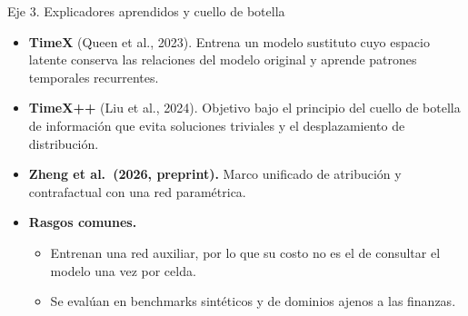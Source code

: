 \documentclass{beamer}
\begin{document}
\begin{frame}{Eje 3. Explicadores aprendidos y cuello de botella}
    \small
    \begin{itemize}
        \item \textbf{TimeX} (Queen et al., 2023). Entrena un modelo
        sustituto cuyo espacio latente conserva las relaciones del modelo
        original y aprende patrones temporales recurrentes.
        \vspace{0.1cm}
        \item \textbf{TimeX++} (Liu et al., 2024). Objetivo bajo el
        principio del cuello de botella de información que evita
        soluciones triviales y el desplazamiento de distribución.
        \vspace{0.1cm}
        \item \textbf{Zheng et al.\ (2026, preprint).} Marco unificado de
        atribución y contrafactual con una red paramétrica.
        \vspace{0.2cm}
        \item \textbf{Rasgos comunes.}
        \begin{itemize}
            \item Entrenan una red auxiliar, por lo que su costo no es el
            de consultar el modelo una vez por celda.
            \item Se evalúan en benchmarks sintéticos y de dominios ajenos
            a las finanzas.
        \end{itemize}
    \end{itemize}
\end{frame}
\end{document}
